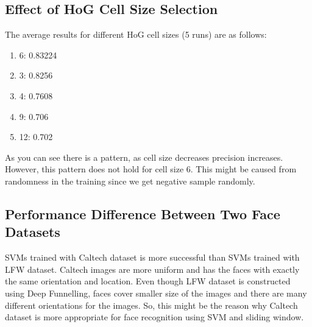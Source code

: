 \documentclass{article}
\begin{document}
\newpage

\subsection{Effect of HoG Cell Size Selection}

The average results for different HoG cell sizes (5 runs) are as follows:
\begin{enumerate} 
\item 6: 0.83224
\item 3: 0.8256
\item 4: 0.7608
\item 9: 0.706
\item 12: 0.702
\end{enumerate}

As you can see there is a pattern, as cell size decreases precision increases. However, this pattern does not hold for cell size 6. This might be caused from randomness in the training since we get negative sample randomly.

\subsection{Performance Difference Between Two Face Datasets}

SVMs trained with Caltech dataset is more successful than SVMs trained with LFW dataset. Caltech images are more uniform and has the faces with exactly the same orientation and location. Even though LFW dataset is constructed using Deep Funnelling, faces cover smaller size of the images and there are many different orientations for the images. So, this might be the reason why Caltech dataset is more appropriate for face recognition using SVM and sliding window.
\end{document}
